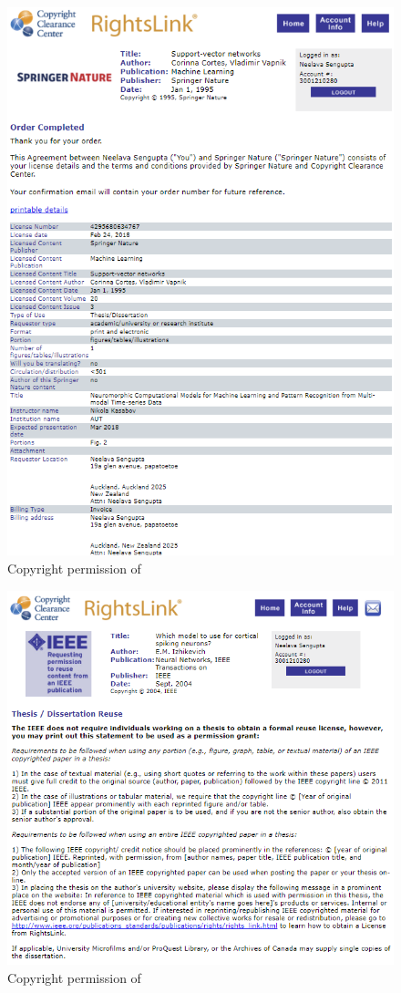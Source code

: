 \begin{figure}
	\centering
	\includegraphics[width=0.8\linewidth]{fig/copyrights/cortes1995.PNG}
	\caption{Copyright permission of \citet{cortes1995support}}
\end{figure}

\begin{figure}
	\centering
	\includegraphics[width=0.8\linewidth]{fig/copyrights/izhikevich2004.PNG}
	\caption{Copyright permission of \citet{izhikevich2004model}}
\end{figure}

